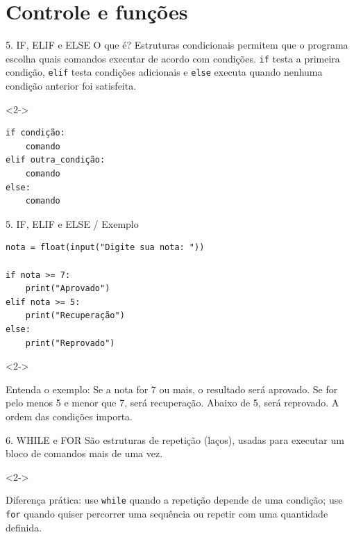 \section{Controle e funções}

\begin{frame}[fragile,t]{5. IF, ELIF e ELSE}
O que é? Estruturas condicionais permitem que o programa escolha quais comandos executar de acordo com condições. \texttt{if} testa a primeira condição, \texttt{elif} testa condições adicionais e \texttt{else} executa quando nenhuma condição anterior foi satisfeita.\par
\begin{visibleenv}<2->
\begin{lstlisting}
if condição:
    comando
elif outra_condição:
    comando
else:
    comando
\end{lstlisting}
\end{visibleenv}
\end{frame}

\begin{frame}[fragile,t]{5. IF, ELIF e ELSE / Exemplo}
\begin{lstlisting}
nota = float(input("Digite sua nota: "))

if nota >= 7:
    print("Aprovado")
elif nota >= 5:
    print("Recuperação")
else:
    print("Reprovado")
\end{lstlisting}
\begin{visibleenv}<2->
\begin{EMASCnote}
Entenda o exemplo: Se a nota for 7 ou mais, o resultado será aprovado. Se for pelo menos 5 e menor que 7, será recuperação. Abaixo de 5, será reprovado. A ordem das condições importa.
\end{EMASCnote}
\end{visibleenv}
\end{frame}

\begin{frame}[t]{6. WHILE e FOR}
São estruturas de repetição (laços), usadas para executar um bloco de comandos mais de uma vez.\par
\begin{visibleenv}<2->
\begin{EMASCnote}
Diferença prática: use \texttt{while} quando a repetição depende de uma condição; use \texttt{for} quando quiser percorrer uma sequência ou repetir com uma quantidade definida.
\end{EMASCnote}
\end{visibleenv}
\end{frame}

